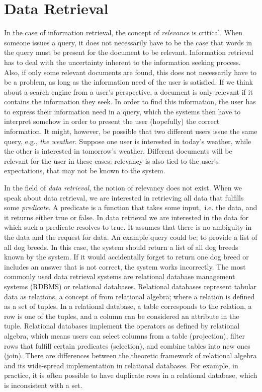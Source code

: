\section{Data Retrieval}
In the case of information retrieval, the concept of \emph{relevance} is critical. When someone issues a query, it does not necessarily have to be the case that words in the query must be present for the document to be relevant. Information retrieval has to deal with the uncertainty inherent to the information seeking process. Also, if only some relevant documents are found, this does not necessarily have to be a problem, as long as the information need of the user is satisfied. If we think about a search engine from a user's perspective, a document is only relevant if it contains the information they seek. In order to find this information, the user has to express their information need in a query, which the systems then have to interpret somehow in order to present the user (hopefully) the correct information. 
It might, however, be possible that two different users issue the same query, e.g., \emph{the weather}. Suppose one user is interested in today's weather, while the other is interested in tomorrow's weather. Different documents will be relevant for the user in these cases: relevancy is also tied to the user's expectations, that may not be known to the system.

In the field of \emph{data retrieval}, the notion of relevancy does not exist. When we speak about data retrieval, we are interested in retrieving all data that fulfills some \emph{predicate}. A predicate is a function that takes some input,\ i.e. the data, and it returns either true or false. In data retrieval we are interested in the data for which such a predicate resolves to true. It assumes that there is no ambiguity in the data and the request for data. An example query could be; to provide a list of all dog breeds. In this case, the system should return a list of all dog breeds known by the system. If it would accidentally forget to return one dog breed or includes an answer that is not correct, the system works incorrectly. 
The most commonly used data retrieval systems are relational database management systems (RDBMS) or relational databases. Relational databases represent tabular data as relations, a concept of from relational algebra; where a relation is defined as a set of tuples. In a relational database, a table corresponds to the relation, a row is one of the tuples, and a column can be considered an attribute in the tuple. Relational databases implement the operators as defined by relational algebra, which means users can select columns from a table (projection), filter rows that fulfill certain predicates (selection), and combine tables into new ones (join). There are differences between the theoretic framework of relational algebra and its wide-spread implementation in relational databases. For example, in practice, it is often possible to have duplicate rows in a relational database, which is inconsistent with a set. 

